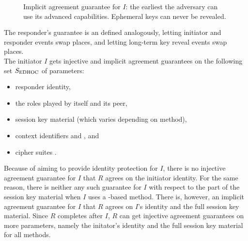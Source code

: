 {\begin{figure}[h!]
\begin{center}
        \caption{Implicit agreement guarantee for $I$: the earliest the
        adversary can use its advanced capabilities. Ephemeral keys can never be
        revealed.}
        \label{fig:impAgreeI}
    \end{center}
\end{figure}
%
The responder's guarantee is an defined analogously, letting initiator and
responder events swap places, and letting long-term key reveal events swap
places.\\
%

The initiator $I$ gets injective and implicit agreement guarantees on the
following set $S_{\text{EDHOC}}$ of parameters:
\begin{itemize}
    \item responder identity,
    \item the roles played by itself and its peer,
    \item session key material (which varies depending on \mEdhoc{} method),
    \item context identifiers \mCi{} and \mCr{}, and
    \item cipher suites \mSuites{}.
\end{itemize}
%
Because of \mEdhoc{} aiming to provide identity protection for $I$, there is no
injective agreement guarantee for $I$ that $R$ agrees on the initiator identity.
%
For the same reason, there is neither any such guarantee for $I$ with respect to
the \mGiy{} part of the session key material when $I$ uses a \mStat{}-based
method.
%
There is, however, an implicit agreement guarantee for $I$ that $R$ agrees on
$I$'s identity and the full session key material.
%
Since $R$ completes after $I$, $R$ can get injective agreement guarantees on
more parameters, namely the initator's identity and the full session key
material for all methods.\\
%

}
